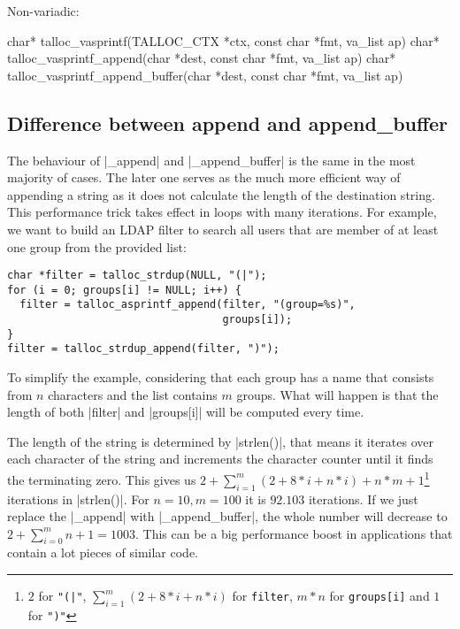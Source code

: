 Non-variadic:
\begin{funcproto}
char* talloc_vasprintf(TALLOC_CTX *ctx, const char *fmt,
                       va_list ap)
char* talloc_vasprintf_append(char *dest, const char *fmt,
                              va_list ap)
char* talloc_vasprintf_append_buffer(char *dest, const char
                                     *fmt, va_list ap)
\end{funcproto}

\subsection{Difference between append and append_buffer}

The behaviour of |_append| and |_append_buffer| is the same in the most majority
of cases. The later one serves as the much more efficient way of appending a
string as it does not calculate the length of the destination string. This
performance trick takes effect in loops with many iterations. For example, we
want to build an LDAP filter to search all users that are member of at least one
group from the provided list:

\begin{lstlisting}[caption={Appending a string},label={lst:append_buffer}]
char *filter = talloc_strdup(NULL, "(|");
for (i = 0; groups[i] != NULL; i++) {
  filter = talloc_asprintf_append(filter, "(group=%s)",
                                  groups[i]);
}
filter = talloc_strdup_append(filter, ")");
\end{lstlisting}

To simplify the example, considering that each group has a name that consists
from $n$ characters and the list contains $m$ groups. What will happen is that
the length of both |filter| and |groups[i]| will be computed every time.

The length of the string is determined by |strlen()|, that means it iterates
over each character of the string and increments the character counter until it
finds the terminating zero. This gives us $2 + \sum_{i=1}^m (2 + 8*i + n*i) +
n*m + 1$\footnote{$2$ for \lstinline{"(|"}, $\sum_{i=1}^m (2 + 8*i + n*i)$ for
\lstinline{filter}, $m*n$ for \lstinline{groups[i]} and $1$ for \lstinline{")"}}
iterations in |strlen()|. For $n = 10, m = 100$ it is $92.103$ iterations. If
we just replace the |_append| with |_append_buffer|, the whole number will
decrease to $2 + \sum_{i=0}^m n + 1 = 1003$. This can be a big performance
boost in applications that contain a lot pieces of similar code.

